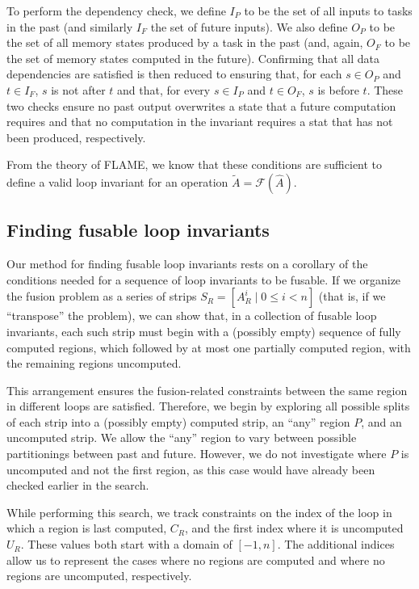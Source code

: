 \documentclass[12pt,letterpaper]{article}
\newcommand*{\opF}{\mathcal{F}}
\begin{document}
To perform the dependency check, we define $I_P$ to be the set of all inputs to tasks in the past (and similarly $I_F$ the set of future inputs).
We also define $O_P$ to be the set of all memory states produced by a task in the past (and, again, $O_F$ to be the set of memory states computed in the future).
Confirming that all data dependencies are satisfied is then reduced to ensuring that, for each $s \in O_P$ and $t \in I_F$, $s$ is not after $t$ and that, for every $s \in I_P$ and $t \in O_F$, $s$ is before $t$.
These two checks ensure no past output overwrites a state that a future computation requires and that no computation in the invariant requires a stat that has not been produced, respectively.

From the theory of FLAME, we know that these conditions are sufficient to define a valid loop invariant for an operation $\widetilde{A} = \opF(\hat{A})$.

\subsection{Finding fusable loop invariants}
Our method for finding fusable loop invariants rests on a corollary of the conditions needed for a sequence of loop invariants to be fusable.
If we organize the fusion problem as a series of strips $S_R = [A_R^i \mid 0 \leq i < n]$ (that is, if we ``transpose'' the problem), we can show that, in a collection of fusable loop invariants, each such strip must begin with a (possibly empty) sequence of fully computed regions, which followed by at most one partially computed region, with the remaining regions uncomputed.

This arrangement ensures the fusion-related constraints between the same region in different loops are satisfied.
Therefore, we begin by exploring all possible splits of each strip into a (possibly empty) computed strip, an ``any'' region $P$, and an uncomputed strip.
We allow the ``any'' region to vary between possible partitionings between past and future.
However, we do not investigate where $P$ is uncomputed and not the first region, as this case would have already been checked earlier in the search.

While performing this search, we track constraints on the index of the loop in which a region is last computed, $C_R$, and the first index where it is uncomputed $U_R$.
These values both start with a domain of $[-1, n]$.
The additional indices allow us to represent the cases where no regions are computed and where no regions are uncomputed, respectively.
\end{document}
